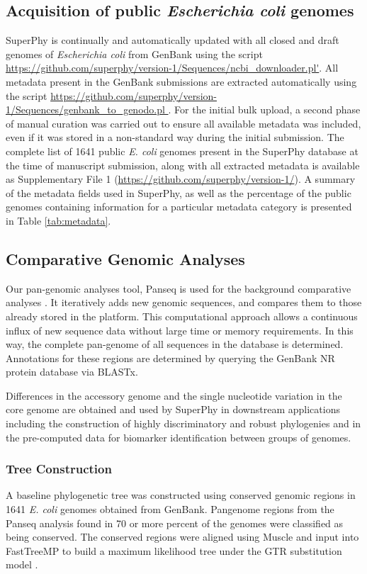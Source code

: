 \documentclass[doublespacing, linenumbers]{bmcart}
\begin{document}
\subsection{Acquisition of public \textit{Escherichia coli} genomes}
SuperPhy is continually and automatically updated with all closed and draft genomes of \textit{Escherichia coli} from GenBank using the script \url{https://github.com/superphy/version-1/Sequences/ncbi_downloader.pl'}. All metadata present in the GenBank submissions are extracted automatically using the script \url{https://github.com/superphy/version-1/Sequences/genbank_to_genodo.pl }. For the initial bulk upload, a second phase of manual curation was carried out to ensure all available metadata was included, even if it was stored in a non-standard way during the initial submission. The complete list of 1641 public \textit{E. coli} genomes present in the SuperPhy database at the time of manuscript submission, along with all extracted metadata is available as Supplementary File 1 (\url{https://github.com/superphy/version-1/}). A summary of the metadata fields used in SuperPhy, as well as the percentage of the public genomes containing information for a particular metadata category is presented in Table \ref{tab:metadata}. 

\subsection{Comparative Genomic Analyses}
Our pan-genomic analyses tool, Panseq is used for the background comparative analyses \cite{laing_pan-genome_2010}. It iteratively adds new genomic sequences, and compares them to those already stored in the platform. This computational approach allows a continuous influx of new sequence data without large time or memory requirements. In this way, the complete pan-genome of all sequences in the database is determined. Annotations for these regions are determined by querying the GenBank NR protein database via BLASTx.

Differences in the accessory genome and the single nucleotide variation in the core genome are obtained and used by SuperPhy in downstream applications including the construction of highly discriminatory and robust phylogenies and in the pre-computed data for biomarker identification between groups of genomes.

\subsubsection{Tree Construction}
A baseline phylogenetic tree was constructed using conserved genomic regions in 1641 \textit{E. coli} genomes obtained from GenBank. Pangenome regions from the Panseq analysis found in 70 or more percent of the genomes were classified as being conserved. The conserved regions were aligned using Muscle \cite{edgar_muscle_2004,edgar_muscle_2004a} and input into FastTreeMP to build a maximum likelihood tree under the GTR substitution model \cite{price_fasttree_2010}. 
\end{document}
